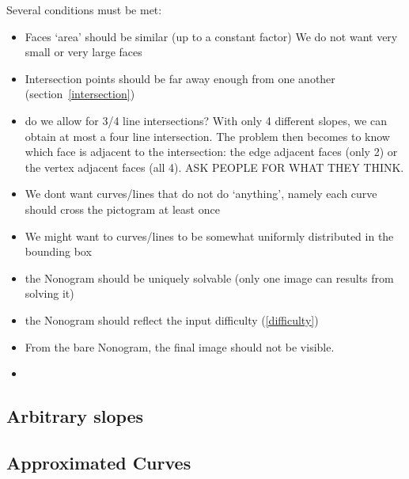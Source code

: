 \documentclass{article}
\begin{document}
Several conditions must be met:
\begin{itemize}
	\item Faces `area' should be similar (up to a constant factor) We do not want very small or very large faces
	\item Intersection points should be far away enough from one another (section~\ref{intersection})
	\item do we allow for 3/4 line intersections? With only 4 different slopes, we can obtain at most a four line intersection. The problem then becomes to know which face is adjacent to the intersection: the edge adjacent faces (only 2) or the vertex adjacent faces (all 4). ASK PEOPLE FOR WHAT THEY THINK.
	\item We dont want curves/lines that do not do `anything', namely each curve should cross the pictogram at least once
	\item We might want to curves/lines to be somewhat uniformly distributed in the bounding box
	\item the Nonogram should be uniquely solvable (only one image can results from solving it)
	\item the Nonogram should reflect the input difficulty (\ref{difficulty})
	\item From the bare Nonogram, the final image should not be visible.
	
	\item

\end{itemize}


\subsection{Arbitrary slopes}

\subsection{Approximated Curves}
\end{document}
